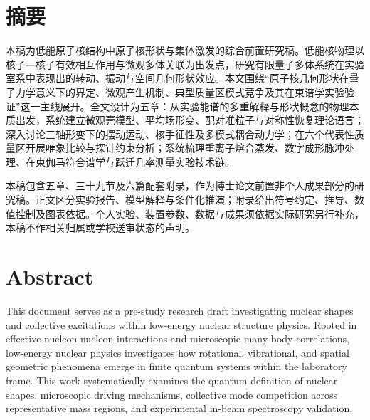 \maketitle%

\intobmk\chapter*{摘\quad 要}%
\setcounter{page}{1}%

本稿为低能原子核结构中原子核形状与集体激发的综合前置研究稿。低能核物理以核子—核子有效相互作用与微观多体关联为出发点，研究有限量子多体系统在实验室系中表现出的转动、振动与空间几何形状效应。本文围绕“原子核几何形状在量子力学意义下的界定、微观产生机制、典型质量区模式竞争及其在束谱学实验验证”这一主线展开。全文设计为五章：从实验能谱的多重解释与形状概念的物理本质出发，系统建立微观壳模型、平均场形变、配对准粒子与对称性恢复理论语言；深入讨论三轴形变下的摆动运动、核手征性及多模式耦合动力学；在六个代表性质量区开展唯象比较与探针约束分析；系统梳理重离子熔合蒸发、数字成形脉冲处理、在束伽马符合谱学与跃迁几率测量实验技术链。

本稿包含五章、三十九节及六篇配套附录，作为博士论文前置非个人成果部分的研究稿。正文区分实验报告、模型解释与条件化推演；附录给出符号约定、推导、数值控制及图表依据。个人实验、装置参数、数据与成果须依据实际研究另行补充，本稿不作相关归属或学校送审状态的声明。

\pagestyle{frontmatterstyle}%
\intobmk\chapter*{Abstract}%
\pagestyle{enfrontmatterstyle}%

This document serves as a pre-study research draft investigating nuclear shapes and collective excitations within low-energy nuclear structure physics. Rooted in effective nucleon-nucleon interactions and microscopic many-body correlations, low-energy nuclear physics investigates how rotational, vibrational, and spatial geometric phenomena emerge in finite quantum systems within the laboratory frame. This work systematically examines the quantum definition of nuclear shapes, microscopic driving mechanisms, collective mode competition across representative mass regions, and experimental in-beam spectroscopy validation.

